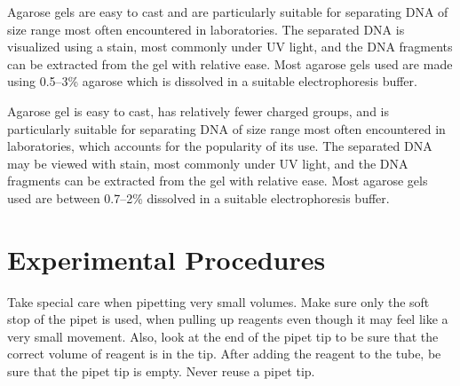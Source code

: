 \documentclass[]{book}
\let\BeginKnitrBlock\begin \let\EndKnitrBlock\end
\begin{document}
Agarose gels are easy to cast and are particularly suitable for separating DNA of size range most often encountered in laboratories. The separated DNA is visualized using a stain, most commonly under UV light, and the DNA fragments can be extracted from the gel with relative ease. Most agarose gels used are made using 0.5--3\% agarose which is dissolved in a suitable electrophoresis buffer.

Agarose gel is easy to cast, has relatively fewer charged groups, and is particularly suitable for separating DNA of size range most often encountered in laboratories, which accounts for the popularity of its use. The separated DNA may be viewed with stain, most commonly under UV light, and the DNA fragments can be extracted from the gel with relative ease. Most agarose gels used are between 0.7--2\% dissolved in a suitable electrophoresis buffer.

\hypertarget{experimental-procedures-12}{%
\section{Experimental Procedures}\label{experimental-procedures-12}}

\BeginKnitrBlock{rmdnote}
Take special care when pipetting very small volumes. Make sure only the soft stop of the pipet is used, when pulling up reagents even though it may feel like a very small movement. Also, look at the end of the pipet tip to be sure that the correct volume of reagent is in the tip. After adding the reagent to the tube, be sure that the pipet tip is empty. Never reuse a pipet tip.
\EndKnitrBlock{rmdnote}
\end{document}
